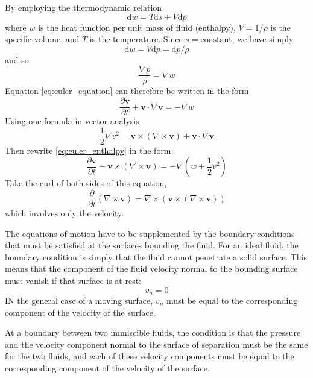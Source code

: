\documentclass[conference]{IEEEtran}
\theoremstyle{definition}
\theoremstyle{remark}
\begin{document}
    By employing the thermodynamic relation
    \[
        \mathrm{d} w = T \mathrm{d} s + V \mathrm{d} p
    \]
    where $w$ is the heat function per unit mass of fluid (enthalpy), $V = 1 / \rho$ is the specific volume, and $T$ is the temperature. Since $s = \text{constant}$, we have simply
    \[
        \mathrm{d} w = V \mathrm{d} p = \mathrm{d} p / \rho
    \]
    and so
    \[
        \dfrac{\nabla p}{\rho} = \nabla w
    \]
    Equation \ref{eq:euler_equation} can therefore be written in the form
    \begin{equation}
        \dfrac{\partial \mathbf{v}}{\partial t} + \mathbf{v} \cdot \nabla \mathbf{v} = - \nabla w
        \label{eq:euler_enthalpy}
    \end{equation}
    Using one formula in vector analysis
    \[
        \dfrac12 \nabla v^2 = \mathbf{v} \times (\nabla \times \mathbf{v}) + \mathbf{v} \cdot \nabla \mathbf{v}
    \]
    Then rewrite \ref{eq:euler_enthalpy} in the form
    \begin{equation}
        \dfrac{\partial \mathbf{v}}{\partial t} - \mathbf{v} \times (\nabla \times \mathbf{v}) = -\nabla (w + \dfrac12 v^2)
    \end{equation}
    Take the curl of both sides of this equation,
    \begin{equation}
        \dfrac{\partial}{\partial t} (\nabla \times \mathbf{v}) = \nabla \times (\mathbf{v} \times (\nabla \times \mathbf{v}))
        \label{eq:euler_velocity}
    \end{equation}
    which involves only the velocity.

    The equations of motion have to be supplemented by the boundary conditions that must be satisfied at the surfaces bounding the fluid. For an ideal fluid, the boundary condition is simply that the fluid cannot penetrate a solid surface. This means that the component of the fluid velocity normal to the bounding surface must vanish if that surface is at rest:
    \begin{equation}
        v_n = 0
    \end{equation}
    IN the general case of a moving surface, $v_n$ must be equal to the corresponding component of the velocity of the surface.

    At a boundary between two immiscible fluids, the condition is that the pressure and the velocity component normal to the surface of separation must be the same for the two fluids, and each of these velocity components must be equal to the corresponding component of the velocity of the surface.
\end{document}
